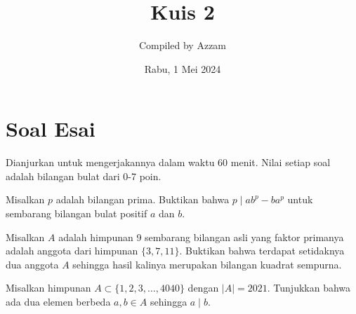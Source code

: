 \documentclass[11pt]{scrartcl}
\begin{document}
	\title{Kuis 2} %
	\date{Rabu, 1 Mei 2024}
	\author{Compiled by Azzam}
	\maketitle
	
	
\section{Soal Esai}
Dianjurkan untuk mengerjakannya dalam waktu 60 menit. Nilai setiap soal adalah bilangan bulat dari 0-7 poin.   
\begin{soalbaru} 
    Misalkan $p$ adalah bilangan prima. Buktikan bahwa $p \mid ab^p - ba^p$ untuk sembarang bilangan bulat positif $a$ dan $b$.
\end{soalbaru}

\begin{soalbaru}
    Misalkan $A$ adalah himpunan 9 sembarang bilangan asli yang faktor primanya adalah anggota dari himpunan $\{3,7,11\}$. Buktikan bahwa terdapat setidaknya dua anggota $A$ sehingga hasil kalinya merupakan bilangan kuadrat sempurna.
\end{soalbaru}

\begin{soalbaru}
    Misalkan himpunan $A \subset \{1,2,3,\dots,4040\}$ dengan $|A| = 2021$. Tunjukkan bahwa ada dua elemen berbeda $a,b \in A$ sehingga $a \mid b$.
\end{soalbaru}
    

	
\end{document}
